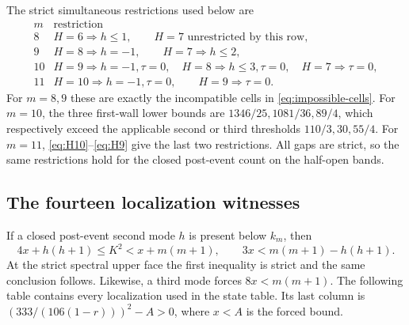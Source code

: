 \documentclass[11pt]{article}
\begin{document}
The strict simultaneous restrictions used below are
\begin{equation}
\begin{array}{c|l}
m&\text{restriction}\\ \hline
8&H=6\Longrightarrow h\leq1,\qquad H=7\text{ unrestricted by this row},\\
9&H=8\Longrightarrow h=-1,\qquad H=7\Longrightarrow h\leq2,\\
10&H=9\Longrightarrow h=-1,\tau=0,\quad
   H=8\Longrightarrow h\leq3,\tau=0,\quad H=7\Longrightarrow\tau=0,\\
11&H=10\Longrightarrow h=-1,\tau=0,\qquad H=9\Longrightarrow\tau=0.
\end{array}
\label{eq:event-simultaneous-restrictions}
\end{equation}
For \(m=8,9\) these are exactly the incompatible cells in
\eqref{eq:impossible-cells}.  For \(m=10\), the three first-wall lower
bounds are \(1346/25,1081/36,89/4\), which respectively exceed the
applicable second or third thresholds \(110/3,30,55/4\).  For \(m=11\),
\eqref{eq:H10}--\eqref{eq:H9} give the last two restrictions.  All gaps
are strict, so the same restrictions hold for the closed post-event count
on the half-open bands.

\subsection{The fourteen localization witnesses}

If a closed post-event second mode \(h\) is present below \(k_m\), then
\[
 4x+h(h+1)\leq K^2<x+m(m+1),
 \qquad
 3x<m(m+1)-h(h+1).
\]
At the strict spectral upper face the first inequality is strict and the
same conclusion follows.  Likewise, a third mode forces
\(8x<m(m+1)\).  The following table contains every localization used in
the state table.  Its last column is
\((333/(106(1-r)))^2-A>0\), where \(x<A\) is the forced bound.
\end{document}
